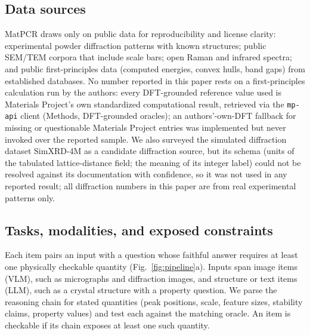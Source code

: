 \documentclass[pdflatex,sn-nature]{sn-jnl}
\begin{document}
\subsection*{Data sources}
MatPCR draws only on public data for reproducibility and license clarity: experimental
powder diffraction patterns with known structures;\cite{opxrd2025} public SEM/TEM corpora
that include scale bars;\cite{aversa2018nffa} open Raman and infrared
spectra;\cite{lafuente2015rruff} and public first-principles data (computed energies,
convex hulls, band gaps) from established databases.\cite{matproj2013} No number reported
in this paper rests on a first-principles calculation run by the authors: every
DFT-grounded reference value used is Materials Project's own standardized computational
result, retrieved via the \texttt{mp-api} client (Methods, DFT-grounded oracles); an
authors'-own-DFT fallback for missing or questionable Materials Project entries was
implemented but never invoked over the reported sample. We also surveyed the simulated
diffraction dataset SimXRD-4M\cite{simxrd2024} as a candidate diffraction source, but its
schema (units of the tabulated lattice-distance field; the meaning of its integer label)
could not be resolved against its documentation with confidence, so it was not used in
any reported result; all diffraction numbers in this paper are from real experimental
patterns only.

\subsection*{Tasks, modalities, and exposed constraints}
Each item pairs an input with a question whose faithful answer requires at least one
physically checkable quantity (Fig.~\ref{fig:pipeline}a). Inputs span image items (VLM), such as micrographs and
diffraction images, and structure or text items (LLM), such as a crystal structure
with a property question. We parse the reasoning chain for stated quantities (peak
positions, scale, feature sizes, stability claims, property values) and test each
against the matching oracle. An item is checkable if its chain exposes at least one
such quantity.
\end{document}
